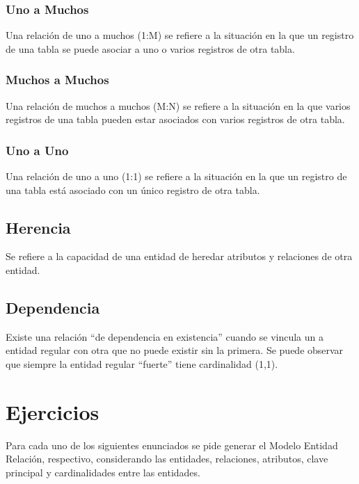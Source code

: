 \documentclass{templateNote}
\begin{document}
\subsubsection{Uno a Muchos}
\indent
Una relación de uno a muchos (1:M) se refiere a la situación en la que un registro
de una tabla se puede asociar a uno o varios registros de otra tabla.


\subsubsection{Muchos a Muchos}
\indent
Una relación de muchos a muchos (M:N) se refiere a la situación en la que varios 
registros de una tabla pueden estar asociados con varios registros de otra tabla. 


\subsubsection{Uno a Uno}
\indent
Una relación de uno a uno (1:1) se refiere a la situación en la que un registro
de una tabla está asociado con un único registro de otra tabla.


\newpage
\subsection{Herencia}
\indent
Se refiere a la capacidad de una entidad de heredar atributos y relaciones de otra entidad. 


\subsection{Dependencia}
\indent
Existe una relación “de dependencia en existencia” cuando se vincula un a entidad
regular con otra que no puede existir sin la primera. Se puede observar que
siempre la entidad regular “fuerte” tiene cardinalidad (1,1).

\section{Ejercicios}
\indent
Para cada uno de los siguientes enunciados se pide generar el Modelo Entidad Relación, respectivo,
considerando las entidades, relaciones, atributos, clave principal y cardinalidades entre las entidades.
\end{document}
